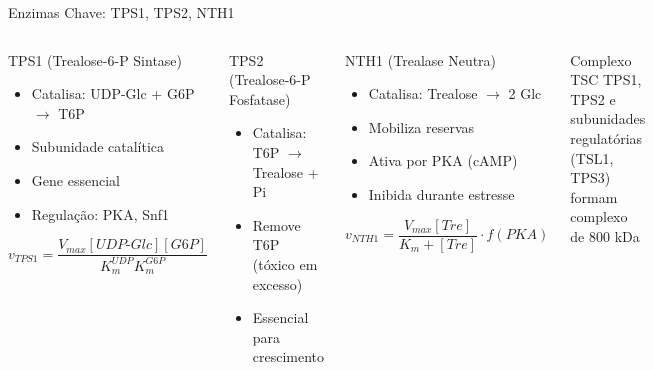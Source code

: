 \begin{frame}{Enzimas Chave: TPS1, TPS2, NTH1}
\begin{columns}
\begin{block}{TPS1 (Trealose-6-P Sintase)}
\begin{itemize}
    \item Catalisa: UDP-Glc + G6P $\rightarrow$ T6P
    \item Subunidade catalítica
    \item Gene essencial
    \item Regulação: PKA, Snf1
\end{itemize}
\begin{equation*}
v_{TPS1} = \frac{V_{max}[UDP\text{-}Glc][G6P]}{K_m^{UDP} K_m^{G6P}}
\end{equation*}
\end{block}

\begin{block}{TPS2 (Trealose-6-P Fosfatase)}
\begin{itemize}
    \item Catalisa: T6P $\rightarrow$ Trealose + Pi
    \item Remove T6P (tóxico em excesso)
    \item Essencial para crescimento
\end{itemize}
\end{block}

\begin{block}{NTH1 (Trealase Neutra)}
\begin{itemize}
    \item Catalisa: Trealose $\rightarrow$ 2 Glc
    \item Mobiliza reservas
    \item Ativa por PKA (cAMP)
    \item Inibida durante estresse
\end{itemize}
\begin{equation*}
v_{NTH1} = \frac{V_{max}[Tre]}{K_m + [Tre]} \cdot f(PKA)
\end{equation*}
\end{block}

\vspace{0.3cm}

\begin{alertblock}{Complexo TSC}
TPS1, TPS2 e subunidades regulatórias (TSL1, TPS3) formam complexo de 800 kDa
\end{alertblock}
\end{columns}
\end{frame}

